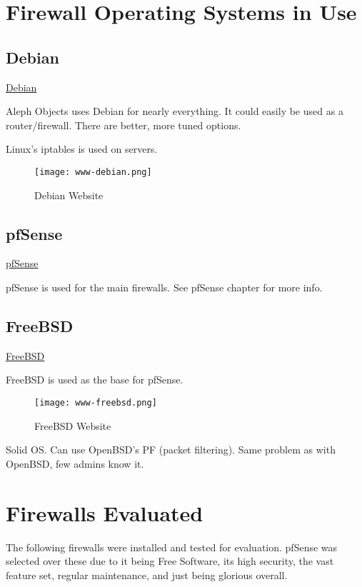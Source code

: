 \section{Firewall Operating Systems in Use}
\subsection{Debian}
 \href{https://www.debian.org/}{Debian}

Aleph Objects uses Debian for nearly everything. It could easily be used as a
router/firewall. There are better, more tuned options.

Linux's iptables is used on servers.

\begin{figure}[h!]
\texttt{[image: www-debian.png]}
 \caption{Debian Website}
 \label{fig:www-debian}
\end{figure}


\subsection{pfSense}
\href{https://www.pfsense.org/}{pfSense}

pfSense is used for the main firewalls. See pfSense chapter for more info.


\subsection{FreeBSD}
 \href{https://www.freebsd.org/}{FreeBSD}

FreeBSD is used as the base for pfSense.

\begin{figure}[h!]
\texttt{[image: www-freebsd.png]}
 \caption{FreeBSD Website}
 \label{fig:www-freebsd}
\end{figure}

Solid OS. Can use OpenBSD's PF (packet filtering). Same problem as with
OpenBSD, few admins know it.


\section{Firewalls Evaluated}
The following firewalls were installed and tested for evaluation. pfSense was
selected over these due to it being Free Software, its high security, the vast
feature set, regular maintenance, and just being glorious overall.


